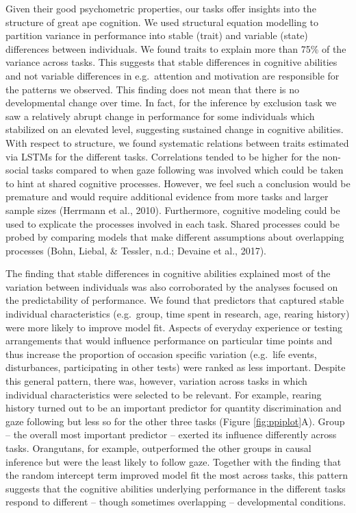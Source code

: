 \documentclass[
  man,floatsintext]{apa6}
\begin{document}
Given their good psychometric properties, our tasks offer insights into the structure of great ape cognition. We used structural equation modelling to partition variance in performance into stable (trait) and variable (state) differences between individuals. We found traits to explain more than 75\% of the variance across tasks. This suggests that stable differences in cognitive abilities and not variable differences in e.g.~attention and motivation are responsible for the patterns we observed. This finding does not mean that there is no developmental change over time. In fact, for the inference by exclusion task we saw a relatively abrupt change in performance for some individuals which stabilized on an elevated level, suggesting sustained change in cognitive abilities. With respect to structure, we found systematic relations between traits estimated via LSTMs for the different tasks. Correlations tended to be higher for the non-social tasks compared to when gaze following was involved which could be taken to hint at shared cognitive processes. However, we feel such a conclusion would be premature and would require additional evidence from more tasks and larger sample sizes (Herrmann et al., 2010). Furthermore, cognitive modeling could be used to explicate the processes involved in each task. Shared processes could be probed by comparing models that make different assumptions about overlapping processes (Bohn, Liebal, \& Tessler, n.d.; Devaine et al., 2017).

The finding that stable differences in cognitive abilities explained most of the variation between individuals was also corroborated by the analyses focused on the predictability of performance. We found that predictors that captured stable individual characteristics (e.g.~group, time spent in research, age, rearing history) were more likely to improve model fit. Aspects of everyday experience or testing arrangements that would influence performance on particular time points and thus increase the proportion of occasion specific variation (e.g.~life events, disturbances, participating in other tests) were ranked as less important. Despite this general pattern, there was, however, variation across tasks in which individual characteristics were selected to be relevant. For example, rearing history turned out to be an important predictor for quantity discrimination and gaze following but less so for the other three tasks (Figure \ref{fig:ppiplot}A). Group -- the overall most important predictor -- exerted its influence differently across tasks. Orangutans, for example, outperformed the other groups in causal inference but were the least likely to follow gaze. Together with the finding that the random intercept term improved model fit the most across tasks, this pattern suggests that the cognitive abilities underlying performance in the different tasks respond to different -- though sometimes overlapping -- developmental conditions.
\end{document}
